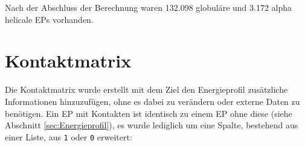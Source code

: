 Nach der Abschluss der Berechnung waren 132.098 globuläre und 3.172 alpha helicale \ac{EP}s vorhanden.

\section{Kontaktmatrix}
\label{sec:Kontaktmatrix}
Die Kontaktmatrix wurde erstellt mit dem Ziel den Energieprofil zusätzliche Informationen hinzuzufügen, ohne es dabei zu verändern oder externe Daten zu benötigen. Ein \ac{EP} mit Kontakten ist identisch zu einem \ac{EP} ohne diese (siehe Abschnitt \ref{sec:Energieprofil}), es wurde lediglich um eine Spalte, bestehend aus einer Liste, aus \texttt{1} oder \texttt{0} erweitert:


\begin{table}
    \centering
    \caption{Dargestellt ist das gleiche \ac{EP} wie in Tabelle \ref{tab:EP}, mit zusätzlichem Kontaktprofil in jeder \texttt{ENGY} Zeile, hierbei steht eine 1 für einen Kontakt und eine 0 für keinen Kontakt innerhalb der 8 Angström Sprähre, vergleiche \ref{fig:8A_Sphaere}.}
    \label{tab:kontaktmatrix}
\end{table}

